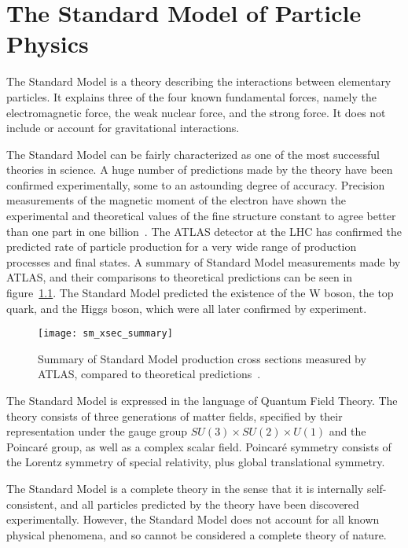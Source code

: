 \chapter{The Standard Model of Particle Physics}\label{ch:sm}

The Standard Model is a theory describing the interactions between elementary particles.
It explains three of the four known fundamental forces, namely the electromagnetic force,
the weak nuclear force, and the strong force.
It does not include  or account for gravitational interactions.

The Standard Model can be fairly characterized as one of the most successful theories in science.
A huge number of predictions made by the theory have been confirmed experimentally,
some to an astounding degree of accuracy.
Precision measurements of the magnetic moment of the electron have shown the experimental and theoretical values of the
fine structure constant to agree better than one part in one billion~\cite{sm-fine-structure-2008}.
The ATLAS detector at the LHC has confirmed the predicted rate of particle production for a very wide range of
production processes and final states.
A summary of Standard Model measurements made by ATLAS, and their comparisons to theoretical predictions can be seen in figure~\ref{fig:sm_xsec_summary}.
The Standard Model predicted the existence of the W boson, the top quark, and the Higgs boson,
which were all later confirmed by experiment.

\begin{figure}[!ht]
    \centering
\texttt{[image: sm\_xsec\_summary]}
\caption{Summary of Standard Model production cross sections measured by ATLAS, compared to theoretical predictions~\cite{sm-summary-plots}.}
\label{fig:sm_xsec_summary}
\end{figure}

The Standard Model is expressed in the language of Quantum Field Theory.
The theory consists of three generations of matter fields,
specified by their representation under the gauge group $SU(3)\times SU(2)\times U(1)$ and the Poincar\'e group,
as well as a complex scalar field.
Poincar\'e symmetry consists of the Lorentz symmetry of special relativity, plus global translational symmetry.

The Standard Model is a complete theory in the sense that it is internally self-consistent,
and all particles predicted by the theory have been discovered experimentally.
However, the Standard Model does not account for all known physical phenomena,
and so cannot be considered a complete theory of nature.

